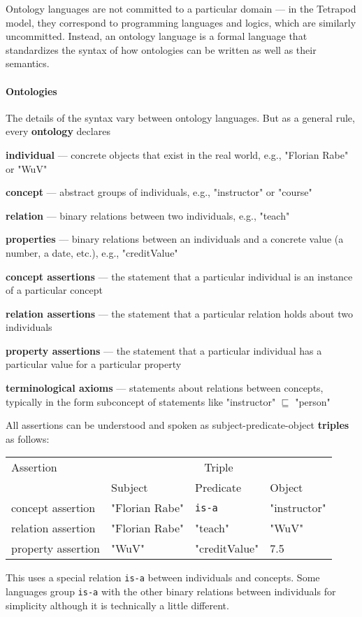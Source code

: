 Ontology languages are not committed to a particular domain --- in the Tetrapod model, they correspond to programming languages and logics, which are similarly uncommitted.
Instead, an ontology language is a formal language that standardizes the syntax of how ontologies can be written as well as their semantics.

\paragraph{Ontologies}
The details of the syntax vary between ontology languages.
But as a general rule, every \textbf{ontology} declares
\begin{compactitem}
 \item \textbf{individual} --- concrete objects that exist in the real world, e.g., "Florian Rabe" or "WuV"
 \item \textbf{concept} --- abstract groups of individuals, e.g., "instructor" or "course"
 \item \textbf{relation} --- binary relations between two individuals, e.g., "teach"
 \item \textbf{properties} --- binary relations between an individuals and a concrete value (a number, a date, etc.), e.g., "creditValue"
 \item \textbf{concept assertions} --- the statement that a particular individual is an instance of a particular concept
 \item \textbf{relation assertions} --- the statement that a particular relation holds about two individuals
 \item \textbf{property assertions} --- the statement that a particular individual has a particular value for a particular property
 \item \textbf{terminological axioms} --- statements about relations between concepts, typically in the form subconcept of statements like "instructor" $\sqsubseteq$ "person"
\end{compactitem}

All assertions can be understood and spoken as subject-predicate-object \textbf{triples} as follows:
\begin{center}
\begin{tabular}{l|lll}
Assertion & \multicolumn{3}{c}{Triple} \\
          & Subject & Predicate & Object \\
\hline
concept assertion  & "Florian Rabe" & \texttt{is-a} & "instructor" \\
relation assertion & "Florian Rabe" & "teach" & "WuV" \\
property assertion & "WuV" & "creditValue" & 7.5 \\
\end{tabular}
\end{center}
This uses a special relation \texttt{is-a} between individuals and concepts.
Some languages group \texttt{is-a} with the other binary relations between individuals for simplicity although it is technically a little different.

